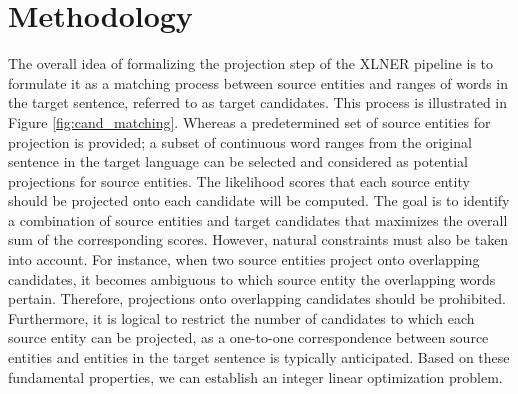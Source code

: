 \chapter{Methodology}
\label{sec:methodology}
The overall idea of formalizing the projection step of the XLNER pipeline is
to formulate it as a matching process between source entities and ranges
of words in the target sentence, referred to as target candidates. This process is
illustrated in Figure \ref{fig:cand_matching}. Whereas a predetermined set of source entities
for projection is provided; a subset of continuous word ranges from the original
sentence in the target language can be selected and considered as potential
projections for source entities. The likelihood scores that each source entity
should be projected onto each candidate will be computed. The goal is to identify a
combination of source entities and target candidates that maximizes the overall
sum of the corresponding scores. However, natural constraints must also be taken into account.
For instance, when two source entities project onto overlapping candidates, it becomes
ambiguous to which source entity the overlapping words pertain. Therefore, projections
onto overlapping candidates should be prohibited. Furthermore, it is logical to
restrict the number of candidates to which each source entity can be projected,
as a one-to-one correspondence between source entities and entities in the
target sentence is typically anticipated. Based on these fundamental properties,
we can establish an integer linear optimization problem.

